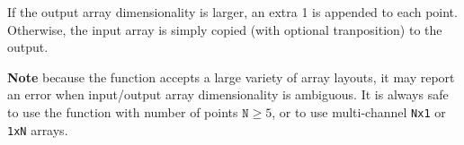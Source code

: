 If the output array dimensionality is larger, an extra 1 is appended to each point.  Otherwise, the input array is simply copied (with optional tranposition) to the output.

\textbf{Note} because the function accepts a large variety of array layouts, it may report an error when input/output array dimensionality is ambiguous. It is always safe to use the function with number of points $\texttt{N} \ge 5$, or to use multi-channel \texttt{Nx1} or \texttt{1xN} arrays.


